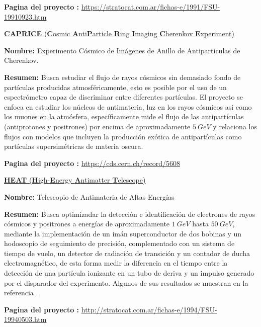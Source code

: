 \begin{itemize_f}
\begin{itemize_f}
\item \textbf{Pagina del proyecto :} \url{https://stratocat.com.ar/fichas-e/1991/FSU-19910923.htm}
\end{itemize_f}

\item[-] \href{https://core.ac.uk/display/25103181}{\textbf{CAPRICE} (\textbf{C}osmic \textbf{A}nti\textbf{P}article \textbf{R}ing \textbf{I}maging \textbf{C}herenkov \textbf{E}xperiment)}
\begin{itemize_f}
\item \textbf{Nombre:} Experimento Cósmico de Imágenes de Anillo de Antipartículas de Cherenkov.
\item \textbf{Resumen:} Busca estudiar el flujo de rayos cósmicos sin demasiado fondo de partículas producidas atmosféricamente, esto es posible por el uso de un espectrómetro capaz de discriminar entre diferentes partículas. El proyecto se enfoca en estudiar los núcleos de antimateria, luz en los rayos cósmicos así como los muones en la atmósfera, específicamente mide el flujo de las antipartículas (antiprotones y positrones) por encima de aproximadamente $5~ GeV$ y relaciona los flujos con modelos que incluyen la producción exótica de antipartículas como partículas supersimétricas de materia oscura. %
\item \textbf{Pagina del proyecto :} \url{https://cds.cern.ch/record/5608}
\end{itemize_f}

\item[-] \href{}{\textbf{HEAT} (\textbf{H}igh-\textbf{E}nergy \textbf{A}ntimatter \textbf{T}elescope)}
\begin{itemize_f}
\item \textbf{Nombre:} Telescopio de Antimateria de Altas Energías
\item \textbf{Resumen:} Busca optimizadar la detección e identificación de electrones de rayos cósmicos y positrones a energías de aproximadamente $1~ GeV$ hasta $50~GeV$, mediante la implementación de un imán superconductor de dos bobinas y un hodoscopio de seguimiento de precisión, complementado con un sistema de tiempo de vuelo, un detector de radiación de transición y un contador de ducha electromagnético, de esta forma medir la diferencia en el tiempo entre la detección de una partícula ionizante en un tubo de deriva y un impulso generado por el disparador del experimento. Algunos de sus resultados se muestran en la referencia \cite{hooper_kaluza-klein_2004}.
\item \textbf{Pagina del proyecto :} \url{http://stratocat.com.ar/fichas-e/1994/FSU-19940503.htm}
\end{itemize_f}


\end{itemize_f}
